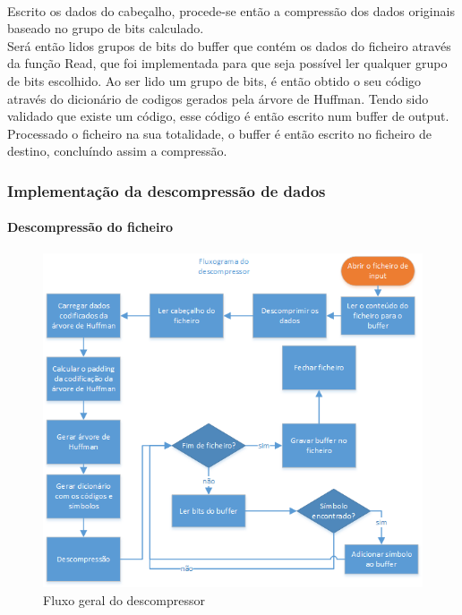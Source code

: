\documentclass[paper=a4, fontsize=11pt]{scrartcl}
\numberwithin{equation}{section}		%
\numberwithin{figure}{section}			%
\numberwithin{table}{section}				%
\begin{document}
\paragraph{}Escrito os dados do cabeçalho, procede-se então a compressão dos dados originais baseado no grupo de bits calculado.
\\
Será então lidos grupos de bits do buffer que contém os dados do ficheiro através da função Read, que foi implementada para que seja possível ler qualquer grupo de bits escolhido.
Ao ser lido um grupo de bits, é então obtido o seu código através do dicionário de codigos gerados pela árvore de Huffman. Tendo sido validado que existe um código, esse código é então escrito num buffer de output.
\\
Processado o ficheiro na sua totalidade, o buffer é então escrito no ficheiro de destino, concluíndo assim a compressão.

\subsubsection{Implementação da descompressão de dados}
\paragraph{Descompressão do ficheiro}

\begin{figure}[h!]
\centering
\includegraphics[scale=1]{fluxodescompressao.png} %
\caption{\label{fig:fluxodescompressor}Fluxo geral do descompressor}
\end{figure}
\FloatBarrier
\end{document}
